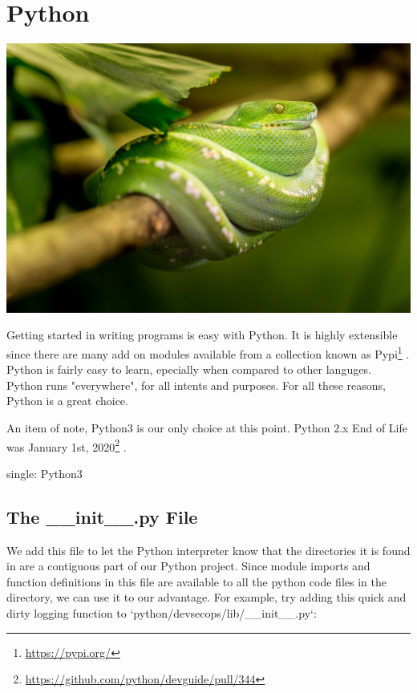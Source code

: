 \makeatletter
{}
\renewcommand{\thefigure}{\thechapter.\@arabic\c@figure}
\makeatother

\hypertarget{python}{%
\section{Python}\label{python}}

\includegraphics{../images/snake-1634293_1920.jpg}

Getting started in writing programs is easy with Python. It is highly
extensible since there are many add on modules available from a
collection known as Pypi\footnote{\url{https://pypi.org/}} . Python is
fairly easy to learn, epecially when compared to other languges. Python
runs "everywhere", for all intents and purposes. For all these reasons,
Python is a great choice.

An item of note, Python3 is our only choice at this point. Python 2.x
End of Life was January 1st, 2020\footnote{\url{https://github.com/python/devguide/pull/344}}
.

single: Python3

\hypertarget{the-__init__.py-file}{%
\subsection{The \_\_init\_\_.py File}\label{the-__init__.py-file}}

We add this file to let the Python interpreter know that the directories
it is found in are a contiguous part of our Python project. Since module
imports and function definitions in this file are available to all the
python code files in the directory, we can use it to our advantage. For
example, try adding this quick and dirty logging function to
`python/devsecops/lib/\_\_init\_\_.py`:

